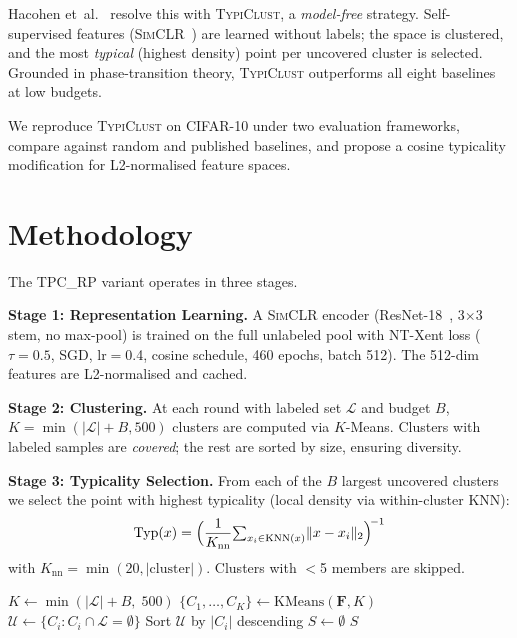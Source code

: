 \documentclass[10pt, conference, twocolumn]{IEEEtran}
\newcommand{\typiclust}{\textsc{TypiClust}}
\newcommand{\tpcrp}{\textsc{TPC\_RP}}
\newcommand{\simclr}{\textsc{SimCLR}}
\begin{document}
Hacohen et~al.~\cite{hacohen2022active} resolve this with
\typiclust{}, a \emph{model-free} strategy.  Self-supervised features
(\simclr{}~\cite{chen2020simclr}) are learned without labels; the space
is clustered, and the most \emph{typical} (highest density) point per
uncovered cluster is selected.  Grounded in phase-transition theory,
\typiclust{} outperforms all eight baselines at low budgets.

We reproduce \typiclust{} on CIFAR-10 under two evaluation frameworks,
compare against random and published baselines, and propose a cosine
typicality modification for L2-normalised feature spaces.


\section{Methodology}
\label{sec:method}

The \tpcrp{} variant operates in three stages.

\smallskip\noindent\textbf{Stage 1: Representation Learning.}\quad
A \simclr{} encoder (ResNet-18~\cite{he2016resnet}, 3$\times$3 stem, no
max-pool) is trained on the full unlabeled pool with NT-Xent loss
($\tau{=}0.5$, SGD, lr$=$0.4, cosine schedule, 460 epochs, batch 512).
The 512-dim features are L2-normalised and cached.

\smallskip\noindent\textbf{Stage 2: Clustering.}\quad
At each round with labeled set $\mathcal{L}$ and budget $B$,
$K{=}\min(|\mathcal{L}|{+}B,500)$ clusters are computed via $K$-Means.
Clusters with labeled samples are \emph{covered}; the rest are sorted
by size, ensuring diversity.

\smallskip\noindent\textbf{Stage 3: Typicality Selection.}\quad
From each of the $B$ largest uncovered clusters we select the point with
highest typicality (local density via within-cluster KNN):
%
\begin{equation}
  \operatorname{Typ}(x)
  = \Bigl(\frac{1}{K_{\mathrm{nn}}}
    {\textstyle\sum_{x_i \in \mathrm{KNN}(x)}} \|x - x_i\|_2
    \Bigr)^{\!-1}
  \label{eq:typicality}
\end{equation}
%
with $K_{\mathrm{nn}}{=}\min(20,|\text{cluster}|)$.  Clusters with
$<$5 members are skipped.

\begin{algorithm}[t]
\small
\DontPrintSemicolon
{}
$K \leftarrow \min(|\mathcal{L}|{+}B,\;500)$\;
$\{C_1,\dots,C_K\} \leftarrow \text{KMeans}(\mathbf{F}, K)$\;
$\mathcal{U} \leftarrow \{C_i : C_i \cap \mathcal{L} = \emptyset\}$
Sort $\mathcal{U}$ by $|C_i|$ descending\;
$S \leftarrow \emptyset$\;
\Return $S$\;
\caption{\typiclust{} Selection (\tpcrp{})}
\label{alg:typiclust}
\end{algorithm}
\end{document}
